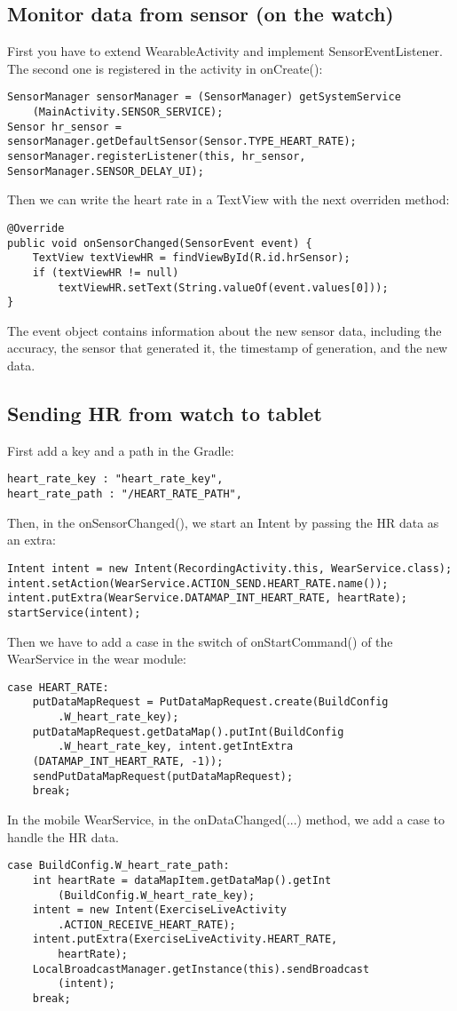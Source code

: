 \documentclass[11pt]{article}
\begin{document}
\subsection{Monitor data from sensor (on the watch)}
First you have to extend WearableActivity and implement SensorEventListener. The second one is registered in the activity in onCreate():
\begin{lstlisting}
SensorManager sensorManager = (SensorManager) getSystemService
    (MainActivity.SENSOR_SERVICE);
Sensor hr_sensor = sensorManager.getDefaultSensor(Sensor.TYPE_HEART_RATE);
sensorManager.registerListener(this, hr_sensor, SensorManager.SENSOR_DELAY_UI);
\end{lstlisting}
Then we can write the heart rate in a TextView with the next overriden method:
\begin{lstlisting}
@Override
public void onSensorChanged(SensorEvent event) {
    TextView textViewHR = findViewById(R.id.hrSensor);
    if (textViewHR != null)
        textViewHR.setText(String.valueOf(event.values[0]));
}
\end{lstlisting}
The event object contains information about the new sensor data, including the accuracy, the sensor that generated it, the timestamp of generation, and the new data.

\subsection{Sending HR from watch to tablet}
First add a key and a path in the Gradle:
\begin{lstlisting}
heart_rate_key : "heart_rate_key",
heart_rate_path : "/HEART_RATE_PATH",
\end{lstlisting}
Then, in the onSensorChanged(), we start an Intent by passing the HR data as an extra:
\begin{lstlisting}
Intent intent = new Intent(RecordingActivity.this, WearService.class);
intent.setAction(WearService.ACTION_SEND.HEART_RATE.name());
intent.putExtra(WearService.DATAMAP_INT_HEART_RATE, heartRate);
startService(intent);
\end{lstlisting}
Then we have to add a case in the switch of onStartCommand() of the WearService in the wear module:
\begin{lstlisting}
case HEART_RATE:
    putDataMapRequest = PutDataMapRequest.create(BuildConfig
        .W_heart_rate_key);
    putDataMapRequest.getDataMap().putInt(BuildConfig
        .W_heart_rate_key, intent.getIntExtra
    (DATAMAP_INT_HEART_RATE, -1));
    sendPutDataMapRequest(putDataMapRequest);
    break;
\end{lstlisting}
In the mobile WearService, in the onDataChanged(...) method, we add a case to handle the HR data.
\begin{lstlisting}
case BuildConfig.W_heart_rate_path:
    int heartRate = dataMapItem.getDataMap().getInt
        (BuildConfig.W_heart_rate_key);
    intent = new Intent(ExerciseLiveActivity
        .ACTION_RECEIVE_HEART_RATE);
    intent.putExtra(ExerciseLiveActivity.HEART_RATE,
        heartRate);
    LocalBroadcastManager.getInstance(this).sendBroadcast
        (intent);
    break;
\end{lstlisting}
\end{document}
